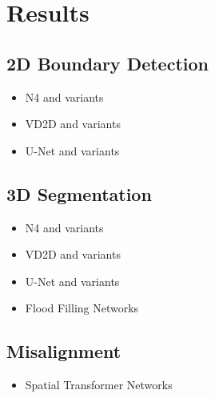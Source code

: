 \section{Results}

\subsection{2D Boundary Detection}

\begin{itemize}
	\item N4 and variants
	\item VD2D and variants
	\item U-Net and variants
\end{itemize}

\subsection{3D Segmentation}

\begin{itemize}
	\item N4 and variants
	\item VD2D and variants
	\item U-Net and variants
	\item Flood Filling Networks
\end{itemize}

\subsection{Misalignment}

\begin{itemize}
	\item Spatial Transformer Networks
\end{itemize}